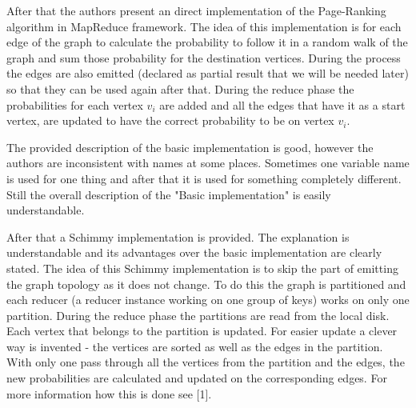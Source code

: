\documentclass[12pt]{article}
\theoremstyle{plain}
\begin{document}

  After that the authors present an direct implementation of the
  Page-Ranking algorithm in MapReduce framework. The idea of this implementation
  is for each edge of the graph to calculate the probability to follow it in
  a random walk of the graph and sum those probability for the destination
  vertices. During the process the edges are also emitted (declared as partial
  result that we will be needed later) so that they can be used again after
  that. During the reduce phase the probabilities for each vertex $v_i$ are
  added and all the edges that have it as a start vertex, are updated to have
  the correct probability to be on vertex $v_i$.
  
  The provided description of the basic implementation is good, however the
  authors are inconsistent with names at some places. Sometimes one variable
  name is used for one thing and after that it is used for something completely
  different. Still the overall description of the "Basic implementation" is
  easily understandable.  

  After that a Schimmy implementation is provided. The explanation is
  understandable and its advantages over the basic implementation are clearly
  stated. The idea of this Schimmy implementation is to skip the part of
  emitting the graph topology as it does not change. To do this the graph is
  partitioned and each reducer (a reducer instance working on one group of
  keys) works on only one partition. During the reduce phase the partitions are
  read from the local disk. Each vertex that belongs to the partition is
  updated.  For easier update a clever way is invented - the vertices are
  sorted as well as the edges in the partition. With only one pass through all
  the vertices from the partition and the edges, the new probabilities are
  calculated and updated on the corresponding edges. For more information how
  this is done see [1]. 
\end{document}
